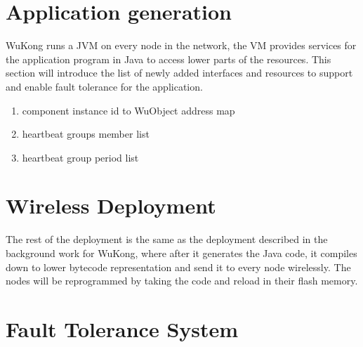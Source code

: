 \section{Application generation}

WuKong runs a JVM on every node in the network, the VM provides services for
the application program in Java to access lower parts of the resources.
This section will introduce the list of newly added interfaces and resources to
support and enable fault tolerance for the application.

\begin{enumerate}
\item component instance id to WuObject address map
\item heartbeat groups member list
\item heartbeat group period list
\end{enumerate}

\section{Wireless Deployment}

The rest of the deployment is the same as the deployment described in the
background work for WuKong, where after it generates the Java code, it compiles
down to lower bytecode representation and send it to every node wirelessly. The
nodes will be reprogrammed by taking the code and reload in their flash memory.




\section{Fault Tolerance System}

